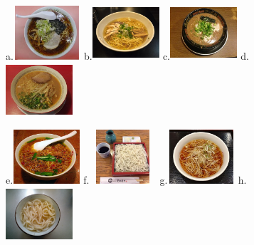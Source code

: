 \documentclass[uplatex,dvipdfmx,b5paper,english,10pt]{jsbook}
\begin{document}
\begin{figure}[htb]\centering\small
{\ttfamily\small
\begin{flushright}
a.\includegraphics[trim=0 0 0 0, clip,     width=25mm, height=20mm]{img/shoyuramen.jpg}
b.\includegraphics[trim=0 11 0 6, clip,    width=25mm, height=20mm]{img/shioramen.jpg}
c.\includegraphics[trim=40 40 40 0, clip,  width=25mm, height=20mm]{img/tonkotsuramen.jpg}
d.\includegraphics[trim=0 0 0 0, clip,     width=25mm, height=20mm]{img/misoramen1.jpg}

e.\includegraphics[trim=0 50 5 0, clip,    width=25mm, height=20mm]{img/CodazziTaiwanRamen.jpg}
f.\includegraphics[trim=0 40 0 0, clip,    width=25mm, height=20mm]{img/zarusoba.jpg}
g.\includegraphics[trim=0 13 0 7, clip,    width=25mm, height=20mm]{img/kakesoba2.jpg}
h.\includegraphics[trim=45 25 55 40, clip, width=25mm, height=20mm]{img/Kakeudon.jpg}


\end{flushright}}
\end{figure}
\end{document}
